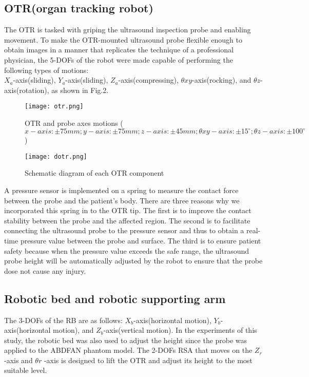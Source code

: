 \documentclass[12pt, a4paper]{article}
\begin{document}
\subsection*{OTR(organ tracking robot)}
The OTR is tasked with griping the ultrasound inspection probe and enabling movement. To make the OTR-mounted ultrasound probe flexible enough to obtain images in a manner that replicates the technique of a professional physician, the 5-DOFs of the robot were made capable of performing the following types of motions:\\

$X_a$-axis(sliding), $Y_a$-axis(sliding), $Z_a$-axis(compressing), $\theta{xy}$-axis(rocking), and $\theta{z}$-axis(rotation), as shown in Fig.2.\\

\begin{figure}[htb]
    \centering
    \texttt{[image: otr.png]}
    \caption{OTR and probe axes motions 
	($x-axis:±75 mm; y-axis:±75 mm; z-axis:±45 mm;
	\theta{xy}-axis:±15^\circ; \theta{z}-axis:±100^\circ$)}
\end{figure}

\begin{figure}[htb]
    \centering
    \texttt{[image: dotr.png]}
    \caption{Schematic diagram of each OTR component}
\end{figure}


A pressure sensor is implemented on a spring to measure the contact force between the probe and the patient’s body. There are three reasons why we incorporated this spring in to the OTR tip. The first is to improve the contact stability between the probe and the affected region. The second is to facilitate connecting the ultrasound probe to the pressure sensor and thus to obtain a real-time pressure value between the probe and surface. The third is to ensure patient safety because when the pressure value exceeds the safe range, the ultrasound probe height will be automatically adjusted by the robot to ensure that the probe dose not cause any injury.

\subsection*{Robotic bed and robotic supporting arm}
The 3-DOFs of the RB are as follows: $X_b$-axis(horizontal motion), $Y_b$-axis(horizontal motion), and $Z_b$-axis(vertical motion). In the experiments of this study, the robotic bed was also used to adjust the height since the probe was applied to the ABDFAN phantom model.
The 2-DOFs RSA that moves on the $Z_r$-axis and $\theta{r}$ -axis is designed to lift the OTR and adjust its height to the most suitable level.
\end{document}
